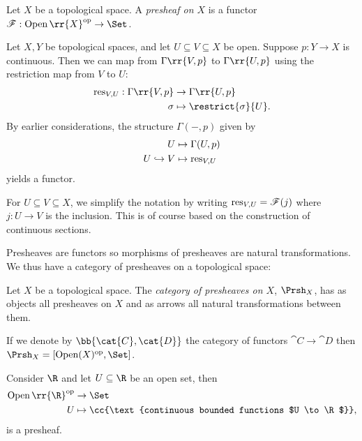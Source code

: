 \documentclass{article}
\begin{document}
\begin{definition}
  Let $X$ be a topological space. A \emph{presheaf on $X$} is a functor
  $\mathscr F:\Open\rr{X}^{\text{op}}\to\Set$.
\end{definition}

\begin{example}
  Let $X, Y$ be topological spaces, and let $U \subseteq V \subseteq X$ be
  open. Suppose $p : Y \to X$ is continuous. Then we can map from
  $\Gamma\rr{V,p}$ to $\Gamma\rr{U,p}$ using the restriction map from $V$ to
  $U$:
  \begin{align*}
    \res_{V,U} : \Gamma\rr{V,p} &\to \Gamma\rr{U,p}\\
    \sigma &\mapsto \restrict{\sigma}{U}.
  \end{align*}
  By earlier considerations, the structure $\Gamma(-,p)$
  given by
  \begin{align*}
    U &\mapsto \Gamma(U,p)\\
    U\hookrightarrow V &\mapsto \operatorname{res}_{V,U}
  \end{align*}
  yields a functor.
\end{example}

\begin{notation}
  For $U\subseteq V\subseteq X$, we simplify the notation by
  writing $\operatorname{res}_{V,U} = \mathscr F(j)$ where $j:U\to V$ is the
  inclusion. This is of course based on the construction of
  continuous sections.
\end{notation}

Presheaves are functors so morphisms of presheaves are natural
transformations. We thus have a category of presheaves on a topological
space:

\begin{definition}
  Let $X$ be a topological space. The \emph{category of presheaves
  on $X$}, $\Prsh_X$, has as objects all presheaves on $X$ and as
  arrows all natural transformations between them.
\end{definition}

If we denote by $\bb{\cat{C},\cat{D}}$ the category of functors
$\cat{C}\to\cat{D}$ then $\Prsh_X = [\Open(X)^{\text{op}},\Set]$.

\begin{example}
  \label{ex:presheafnongluing}
  Consider $\R$ and let $U \subseteq \R$ be an open set, then
  \begin{align*}
    \Open\rr{\R}^{\text{op}} &\to \Set\\
    U &\mapsto \cc{\text{continuous bounded functions $U \to \R$}},
  \end{align*}
  is a presheaf.
\end{example}
\end{document}
